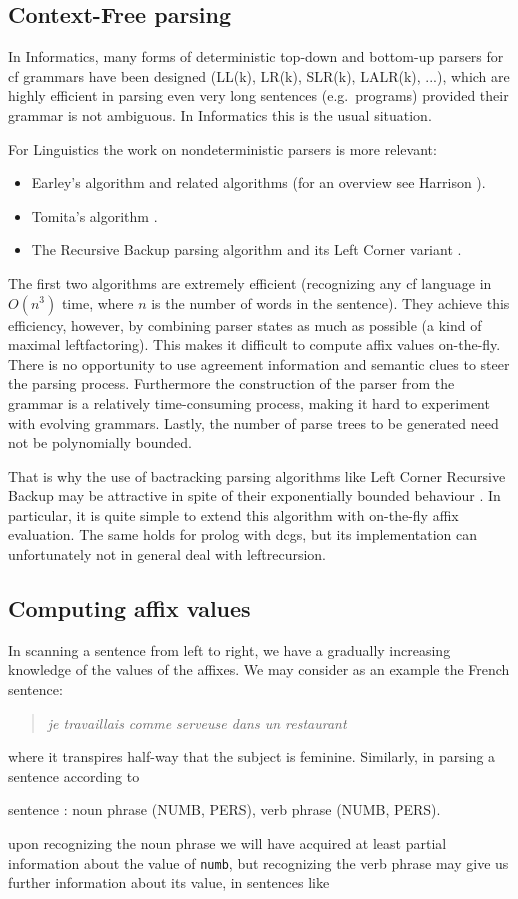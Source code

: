 \subsection{Context-Free parsing}
In Informatics, many forms of deterministic top-down and bottom-up
parsers for {\sc cf} grammars have been designed
(LL(k), LR(k), SLR(k), LALR(k), ...), which are highly efficient in
parsing even very long sentences (e.g.\ programs) provided their grammar
is not ambiguous. In Informatics this is the usual situation.

For Linguistics the work on nondeterministic parsers is more relevant:
\begin{itemize}
\item Earley's algorithm \cite{l4} and related algorithms (for
an overview see Harrison \cite{l6}).
\item Tomita's algorithm \cite{l15}.
\item The Recursive Backup parsing algorithm \cite{l10} and its Left
Corner variant \cite{meijer:diss}.
\end{itemize}
The first two algorithms are extremely efficient (recognizing any {\sc cf}
language in $O(n^3)$ time, where $n$ is the number of words in the
sentence). They achieve this efficiency, however, by combining parser
states as much as possible (a kind of maximal leftfactoring). This
makes it difficult to compute affix values on-the-fly. There is no opportunity
to use agreement information and semantic clues to steer the parsing process.
Furthermore the construction of the parser from the grammar is a relatively
time-consuming process, making it hard to experiment with evolving grammars.
Lastly, the number of parse trees to be generated need not be
polynomially bounded.

That is why the use of bactracking parsing algorithms like Left Corner Recursive
Backup may be attractive in spite of their exponentially bounded behaviour
\cite{l27}. In particular, it is quite simple to extend this algorithm with
on-the-fly affix evaluation. The same holds for {\sc prolog} with {\sc dcg}s, but its
implementation can unfortunately not in general deal with leftrecursion.
\subsection{Computing affix values}
In scanning a sentence from left to right, we have a
gradually increasing knowledge of the values of the affixes. We
may consider as an example the French sentence:
\begin{quote}
{\sl je travaillais comme serveuse dans un restaurant}
\end{quote}
\noindent
where it transpires half-way that the subject is feminine. Similarly,
in parsing a sentence according to
\begin{elan}
sentence : noun phrase (NUMB, PERS), verb phrase (NUMB, PERS).
\end{elan}
\noindent
upon recognizing the noun phrase we will have acquired at least partial
information about the value of {\tt numb}, but recognizing the verb phrase
may give us further information about its value, in sentences like

